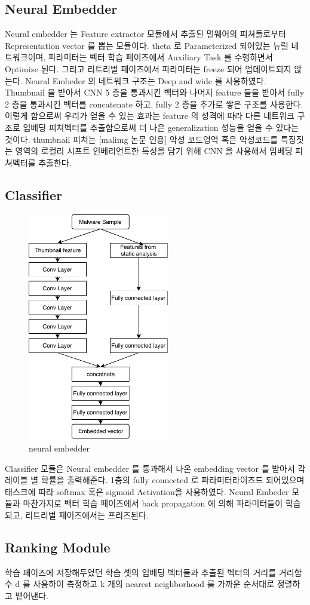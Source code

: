 \subsection{Neural Embedder}
Neural embedder 는 Feature extractor 모듈에서 추출된 멀웨어의 피쳐들로부터 Representation vector 를 뽑는 모듈이다. theta 로 Parameterized 되어있는 뉴럴 네트워크이며, 파라미터는 벡터 학습 페이즈에서 Auxiliary Task 를 수행하면서 Optimize 된다. 그리고 리트리벌 페이즈에서 파라미터는 freeze 되어 업데이트되지 않는다. 
Neural Embeder 의 네트워크 구조는 Deep and wide 를 사용하였다. Thumbnail 을 받아서 CNN 5 층을 통과시킨 벡터와 나머지 feature 들을 받아서 fully 2 층을 통과시킨 벡터를 concatenate 하고, fully 2 층을 추가로 쌓은 구조를 사용한다. 이렇게 함으로써 우리가 얻을 수 있는 효과는 feature 의 성격에 따라 다른 네트워크 구조로 임베딩 피쳐벡터를 추출함으로써 더 나은 generalization 성능을 얻을 수 있다는 것이다. thumbnail 피쳐는 [malimg 논문 인용] 악성 코드영역 혹은 악성코드를 특징짓는 영역의 로컬리 시프트 인베리언트한 특성을 담기 위해 CNN 을 사용해서 임베딩 피쳐벡터를 추출한다. 


\subsection{Classifier}
\begin{figure}
  \includegraphics[height=10cm]{../figures/neural_embedder.pdf}
  \caption{neural embedder}
  \label{fig:three}
\end{figure}

Classifier 모듈은 Neural embedder 를 통과해서 나온 embedding vector 를 받아서 각 레이블 별 확률을 출력해준다. 1층의 fully connected 로 파라미터라이즈드 되어있으며 태스크에 따라 softmax 혹은 sigmoid Activation을 사용하였다. Neural Embeder 모듈과 마찬가지로 벡터 학습 페이즈에서 back propagation 에 의해 파라미터들이 학습되고, 리트리벌 페이즈에서는 프리즈된다. 


\subsection{Ranking Module}
학습 페이즈에 저장해두었던 학습 셋의 임베딩 벡터들과 추출된 벡터의 거리를 거리함수 d 를 사용하여 측정하고 k 개의 nearest neighborhood 를 가까운 순서대로 정렬하고 뱉어낸다.


